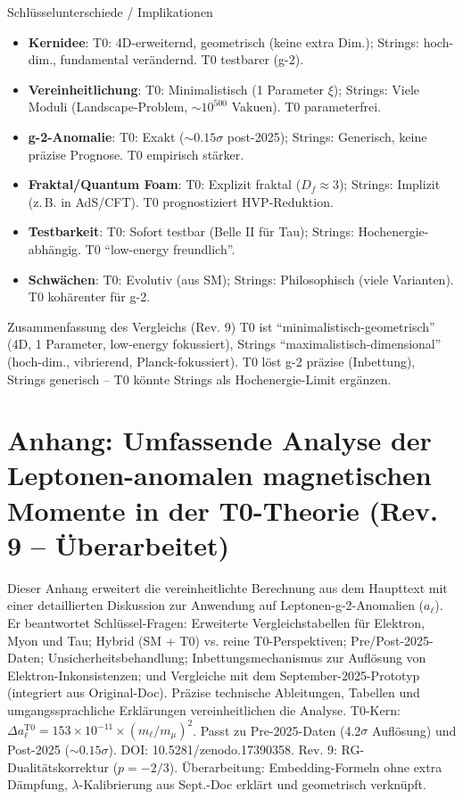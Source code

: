 \documentclass[12pt,a4paper]{article}
\theoremstyle{definition}
\begin{document}
	\begin{interpretation}{Schlüsselunterschiede / Implikationen}
		\begin{itemize}
			\item \textbf{Kernidee}: T0: 4D-erweiternd, geometrisch (keine extra Dim.); Strings: hoch-dim., fundamental verändernd. T0 testbarer (g-2).
			\item \textbf{Vereinheitlichung}: T0: Minimalistisch (1 Parameter $\xi$); Strings: Viele Moduli (Landscape-Problem, $\sim 10^{500}$ Vakuen). T0 parameterfrei.
			\item \textbf{g-2-Anomalie}: T0: Exakt ($\sim 0.15\sigma$ post-2025); Strings: Generisch, keine präzise Prognose. T0 empirisch stärker.
			\item \textbf{Fraktal/Quantum Foam}: T0: Explizit fraktal ($D_f \approx 3$); Strings: Implizit (z.\,B. in AdS/CFT). T0 prognostiziert HVP-Reduktion.
			\item \textbf{Testbarkeit}: T0: Sofort testbar (Belle II für Tau); Strings: Hochenergie-abhängig. T0 ``low-energy freundlich''.
			\item \textbf{Schwächen}: T0: Evolutiv (aus SM); Strings: Philosophisch (viele Varianten). T0 kohärenter für g-2.
		\end{itemize}
	\end{interpretation}
	
	\begin{result}{Zusammenfassung des Vergleichs (Rev. 9)}
		T0 ist ``minimalistisch-geometrisch'' (4D, 1 Parameter, low-energy fokussiert), Strings ``maximalistisch-dimensional'' (hoch-dim., vibrierend, Planck-fokussiert). T0 löst g-2 präzise (Inbettung), Strings generisch -- T0 könnte Strings als Hochenergie-Limit ergänzen.
	\end{result}
	
	\appendix
	\section{Anhang: Umfassende Analyse der Leptonen-anomalen magnetischen Momente in der T0-Theorie (Rev. 9 -- Überarbeitet)}
	
	Dieser Anhang erweitert die vereinheitlichte Berechnung aus dem Haupttext mit einer detaillierten Diskussion zur Anwendung auf Leptonen-g-2-Anomalien ($a_\ell$). Er beantwortet Schlüssel-Fragen: Erweiterte Vergleichstabellen für Elektron, Myon und Tau; Hybrid (SM + T0) vs. reine T0-Perspektiven; Pre/Post-2025-Daten; Unsicherheitsbehandlung; Inbettungsmechanismus zur Auflösung von Elektron-Inkonsistenzen; und Vergleiche mit dem September-2025-Prototyp (integriert aus Original-Doc). Präzise technische Ableitungen, Tabellen und umgangssprachliche Erklärungen vereinheitlichen die Analyse. T0-Kern: $\Delta a_\ell^\text{T0} = 153 \times 10^{-11} \times (m_\ell / m_\mu)^2$. Passt zu Pre-2025-Daten (4.2$\sigma$ Auflösung) und Post-2025 ($\sim 0.15\sigma$). DOI: 10.5281/zenodo.17390358. Rev. 9: RG-Dualitätskorrektur ($p=-2/3$). Überarbeitung: Embedding-Formeln ohne extra Dämpfung, $\lambda$-Kalibrierung aus Sept.-Doc erklärt und geometrisch verknüpft.
	
\end{document}
